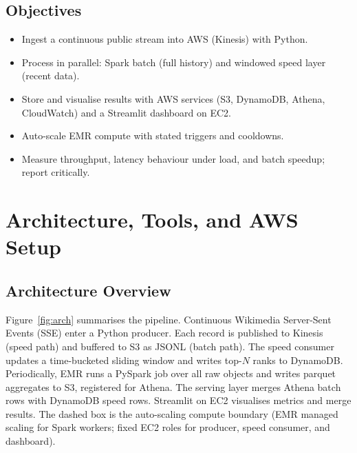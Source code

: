 \documentclass[conference]{IEEEtran}
\begin{document}
\subsection{Objectives}
\begin{itemize}
\item Ingest a continuous public stream into AWS (Kinesis) with Python.
\item Process in parallel: Spark batch (full history) and windowed speed layer (recent data).
\item Store and visualise results with AWS services (S3, DynamoDB, Athena, CloudWatch) and a Streamlit dashboard on EC2.
\item Auto-scale EMR compute with stated triggers and cooldowns.
\item Measure throughput, latency behaviour under load, and batch speedup; report critically.
\end{itemize}

\section{Architecture, Tools, and AWS Setup}
\subsection{Architecture Overview}
Figure~\ref{fig:arch} summarises the pipeline. Continuous Wikimedia Server-Sent Events (SSE) enter a Python producer. Each record is published to Kinesis (speed path) and buffered to S3 as JSONL (batch path). The speed consumer updates a time-bucketed sliding window and writes top-$N$ ranks to DynamoDB. Periodically, EMR runs a PySpark job over all raw objects and writes parquet aggregates to S3, registered for Athena. The serving layer merges Athena batch rows with DynamoDB speed rows. Streamlit on EC2 visualises metrics and merge results. The dashed box is the auto-scaling compute boundary (EMR managed scaling for Spark workers; fixed EC2 roles for producer, speed consumer, and dashboard).
\end{document}
